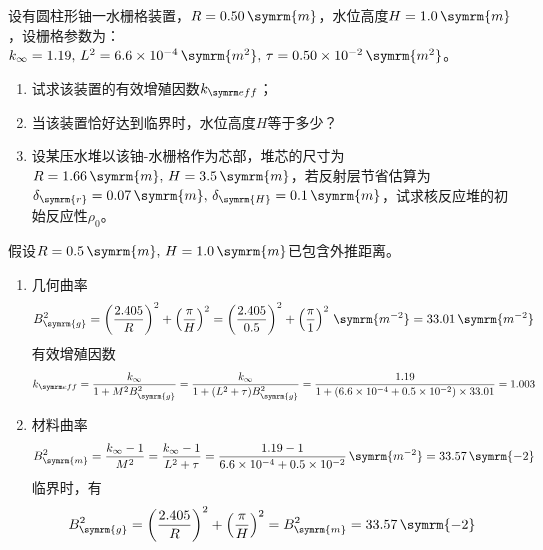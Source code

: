 \begin{exercise}
    设有圆柱形铀一水栅格装置，$R = 0.50\,\symrm{m}$，水位高度$H = 1.0\,\symrm{m}$，设栅格参数为：$k_{\infty} = 1.19,\,L^2 = 6.6\times 10^{-4}\,\symrm{m^2},\,\tau = 0.50\times 10^{-2}\,\symrm{m^2}$。
    \begin{enumerate}[(1)]
        \item 试求该装置的有效增殖因数$\keff$；
        \item 当该装置恰好达到临界时，水位高度$H$等于多少？
        \item 设某压水堆以该铀-水栅格作为芯部，堆芯的尺寸为$R = 1.66\,\symrm{m},\,H = 3.5\,\symrm{m}$，若反射层节省估算为$\delta_{\symrm{r}} = 0.07\,\symrm{m},\,\delta_{\symrm{H}} = 0.1\,\symrm{m}$，试求核反应堆的初始反应性$\rho_0$。
    \end{enumerate}
    \begin{solution}
        假设$R=0.5\,\symrm{m},\,H=1.0\,\symrm{m}$已包含外推距离。
        \begin{enumerate}[(1)]
            \item 几何曲率
            \begin{equation*}
                B_{\symrm{g}}^2 = \left(\frac{2.405}{R}\right)^2 + \left(\frac{\pi}{H}\right)^2 = \left(\frac{2.405}{0.5}\right)^2 + \left(\frac{\pi}{1}\right)^2\,\symrm{m^{-2}} = 33.01\,\symrm{m^{-2}}
            \end{equation*}
            有效增殖因数
            \begin{equation*}
                \keff = \frac{k_{\infty}}{1 + M^2 B_{\symrm{g}}^2} = \frac{k_{\infty}}{1 + (L^2 + \tau) B_{\symrm{g}}^2} = \frac{1.19}{1 + (6.6\times 10^{-4} + 0.5\times 10^{-2}) \times 33.01} = 1.003
            \end{equation*}
            \item 材料曲率
            \begin{equation*}
                B_{\symrm{m}}^2 = \frac{k_{\infty} - 1}{M^2} = \frac{k_{\infty} - 1}{L^2 + \tau} = \frac{1.19 - 1}{6.6\times 10^{-4} + 0.5\times 10^{-2}}\,\symrm{m^{-2}} = 33.57\,\symrm{-2}
            \end{equation*}
            临界时，有
            \begin{equation*}
                B_{\symrm{g}}^2 = \left(\frac{2.405}{R}\right)^2 + \left(\frac{\pi}{H}\right)^2 = B_{\symrm{m}}^2 = 33.57\,\symrm{-2}
            \end{equation*}
            

\end{enumerate}
\end{solution}
\end{exercise}
